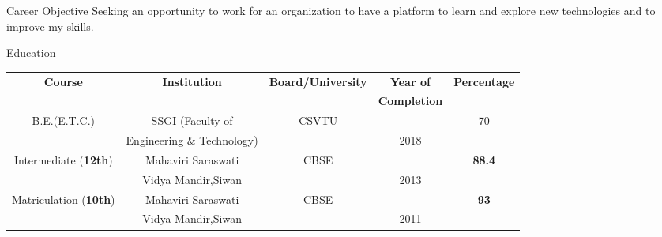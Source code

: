 \documentclass{resume} %
\begin{document}
\begin{rSection}{Career Objective}
Seeking an opportunity to work for an organization to have a platform to learn and explore new technologies and to improve my skills.\\
\end{rSection}


\begin{rSection}{Education}
\begin{tabular}{ ||c|c|c|c|c|| } \hline
\textbf{Course} &  \textbf{Institution} &\textbf{Board/University} &\textbf{Year of} &\textbf{Percentage} \\
                   &  & &\textbf{Completion} &\\  \hline
B.E.(E.T.C.) & {SSGI (Faculty of }& CSVTU && 70\\ 
                 & Engineering \& Technology) & &2018 & \\ \hline
            

Intermediate (\textbf{12th}) & Mahaviri Saraswati & CBSE & & \textbf{88.4}\\                                  &  Vidya Mandir,Siwan & &2013 &\\ \hline
Matriculation (\textbf{10th}) & Mahaviri Saraswati  & CBSE&  & \textbf{93}\\                                      & Vidya Mandir,Siwan & &2011 &\\ \hline 


\end{tabular} \\
 


\end{rSection}
\end{document}
